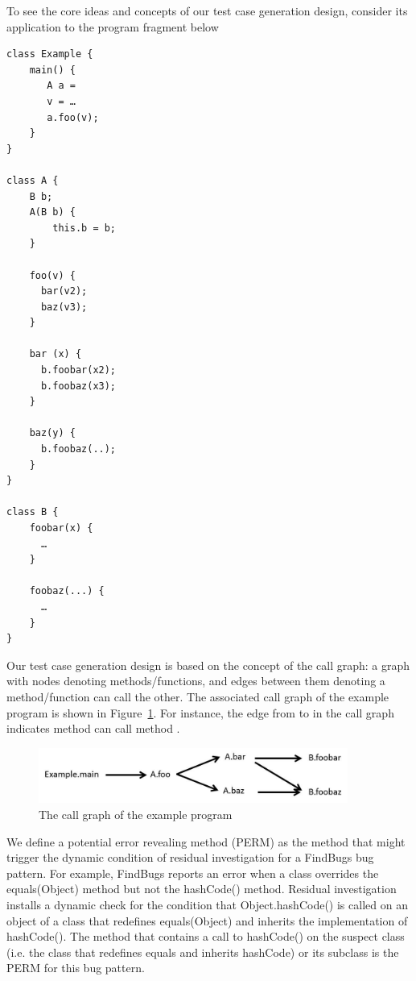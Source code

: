 To see the core ideas and concepts of our test case generation design, consider its application to the program fragment below

\begin{lstlisting}[style=JavaStyle, caption=An example Pig Latin program, label=lst:example, frame=none]
class Example {
	main() {
	   A a = 
	   v = …
	   a.foo(v);
	}
}

class A {
	B b;
	A(B b) {
		this.b = b;
	}

	foo(v) {
	  bar(v2);
	  baz(v3);
	}

	bar (x) {
	  b.foobar(x2);
	  b.foobaz(x3);
	}

	baz(y) {
	  b.foobaz(..);
	}
}

class B {
	foobar(x) {
	  …
	}

	foobaz(...) {
	  …
	}
}
\end{lstlisting}

Our test case generation design is based on the concept of the call graph: a graph with nodes denoting methods/functions, and edges between them denoting a method/function can call the other.  The associated call graph of the example program is shown in Figure~\ref{fig:call-graph-example}.  For instance, the edge from  to  in the call graph indicates method  can call method . 

\begin{figure}[h]
\centering
\includegraphics[width=4.0in, trim=0in 0in 0in 0in, clip]{call_graph.jpg}
\caption{The call graph of the example program}
\label{fig:call-graph-example}
\end{figure}

We define a potential error revealing method (PERM) as the method that might trigger the dynamic condition of residual investigation for a FindBugs bug pattern.  For example, FindBugs reports an error when a class overrides the equals(Object) method but not the hashCode() method.  Residual investigation installs a dynamic check for the condition that Object.hashCode() is called on an object of a class that redefines equals(Object) and inherits the implementation of hashCode(). The method that contains a call to hashCode() on the suspect class (i.e. the class that redefines equals and inherits hashCode) or its subclass is the PERM for this bug pattern.  

